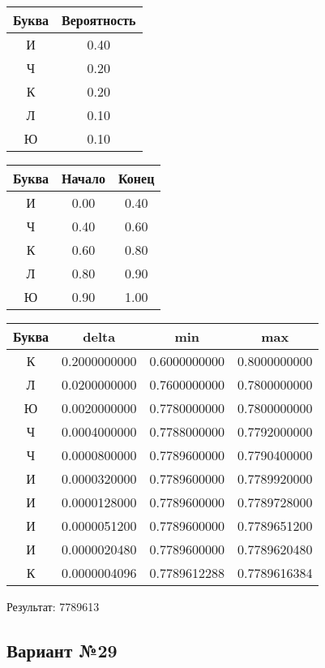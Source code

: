 \documentclass[a4paper, 12pt]{article}
\begin{document}
\begin{center}
 \begin{tabular}{ |c|c| } 
  \hline
     Буква & Вероятность \\ \hline
И & 0.40\\\hline
Ч & 0.20\\\hline
К & 0.20\\\hline
Л & 0.10\\\hline
Ю & 0.10
\\ \hline \end{tabular}
\end{center}
\begin{center}
 \begin{tabular}{ |c|c|c| } 
  \hline
     Буква & Начало & Конец \\ \hline
И & 0.00 & 0.40\\\hline
Ч & 0.40 & 0.60\\\hline
К & 0.60 & 0.80\\\hline
Л & 0.80 & 0.90\\\hline
Ю & 0.90 & 1.00
\\ \hline \end{tabular}
\end{center}
\begin{center}
 \begin{tabular}{ |c|c|c|c| } 
  \hline
     Буква & delta & min & max \\ \hline
К & 0.2000000000 & 0.6000000000 & 0.8000000000\\\hline
Л & 0.0200000000 & 0.7600000000 & 0.7800000000\\\hline
Ю & 0.0020000000 & 0.7780000000 & 0.7800000000\\\hline
Ч & 0.0004000000 & 0.7788000000 & 0.7792000000\\\hline
Ч & 0.0000800000 & 0.7789600000 & 0.7790400000\\\hline
И & 0.0000320000 & 0.7789600000 & 0.7789920000\\\hline
И & 0.0000128000 & 0.7789600000 & 0.7789728000\\\hline
И & 0.0000051200 & 0.7789600000 & 0.7789651200\\\hline
И & 0.0000020480 & 0.7789600000 & 0.7789620480\\\hline
К & 0.0000004096 & 0.7789612288 & 0.7789616384
\\ \hline \end{tabular}
\end{center}
Результат: 7789613
\pagebreak
\subsection{Вариант №29}
\end{document}
